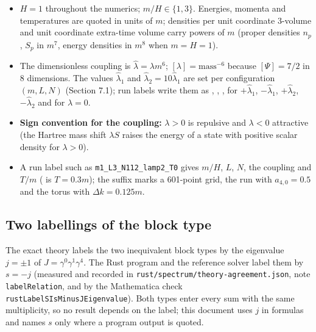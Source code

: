 \documentclass[11pt]{article}
\begin{document}
\begin{itemize}
\item $H=1$ throughout the numerics; $m/H\in\{1,3\}$. Energies, momenta and temperatures are quoted in units of $m$; densities per unit coordinate 3-volume and unit coordinate extra-time volume carry powers of $m$ (proper densities $n_p$, $S_p$ in $m^7$, energy densities in $m^8$ when $m=H=1$).
\item The dimensionless coupling is $\hat\lambda=\lambda m^6$; $[\lambda]=\mathrm{mass}^{-6}$ because $[\Psi]=7/2$ in 8 dimensions. The values $\hat\lambda_1$ and $\hat\lambda_2=10\hat\lambda_1$ are set per configuration $(m,L,N)$ (Section 7.1); run labels write them as \texttt{}, \texttt{}, \texttt{}, \texttt{} for $+\hat\lambda_1$, $-\hat\lambda_1$, $+\hat\lambda_2$, $-\hat\lambda_2$ and \texttt{} for $\lambda=0$.
\item \textbf{Sign convention for the coupling:} $\lambda>0$ is repulsive and $\lambda<0$ attractive (the Hartree mass shift $\lambda S$ raises the energy of a state with positive scalar density for $\lambda>0$).
\item A run label such as \texttt{m1\_L3\_N1\allowbreak{}12\_lamp2\allowbreak{}\_T0} gives $m/H$, $L$, $N$, the coupling and $T/m$ (\texttt{} is $T=0.3m$); the suffix \texttt{} marks a 601-point grid, \texttt{} the run with $a_{4,0}=0.5$ and \texttt{} the torus with $\Delta k=0.125m$.
\end{itemize}

\subsection{Two labellings of the block type}

The exact theory labels the two inequivalent block types by the eigenvalue $j=\pm1$ of $J=\gamma^0\gamma^1\gamma^4$. The Rust program and the reference solver label them by $s=-j$ (measured and recorded in \texttt{rust/spe\allowbreak{}ctrum/th\allowbreak{}eory-agr\allowbreak{}eement.j\allowbreak{}son}, note \texttt{labelRel\allowbreak{}ation}, and by the Mathematica check \texttt{rustLabe\allowbreak{}lSIsMinu\allowbreak{}sJEigenv\allowbreak{}alue}). Both types enter every sum with the same multiplicity, so no result depends on the label; this document uses $j$ in formulas and names $s$ only where a program output is quoted.
\end{document}
